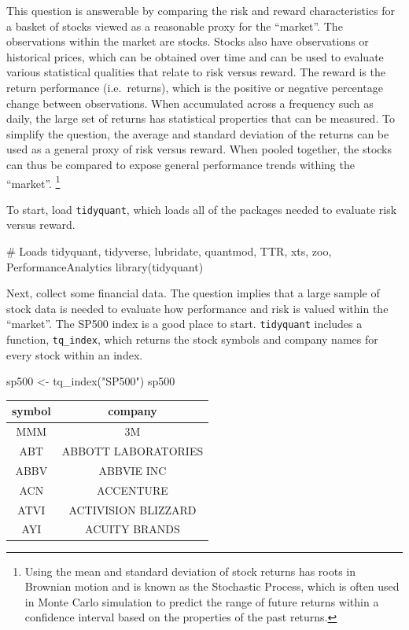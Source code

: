 This question is answerable by comparing the risk and reward
characteristics for a basket of stocks viewed as a reasonable proxy for
the ``market''. The observations within the market are stocks. Stocks
also have observations or historical prices, which can be obtained over
time and can be used to evaluate various statistical qualities that
relate to risk versus reward. The reward is the return performance
(i.e.~returns), which is the positive or negative percentage change
between observations. When accumulated across a frequency such as daily,
the large set of returns has statistical properties that can be
measured. To simplify the question, the average and standard deviation
of the returns can be used as a general proxy of risk versus reward.
When pooled together, the stocks can thus be compared to expose general
performance trends withing the ``market''.
\footnote{Using the mean and standard deviation of stock returns has roots in Brownian motion and is known as the Stochastic Process, which is often used in Monte Carlo simulation to predict the range of future returns within a confidence interval based on the properties of the past returns. }

To start, load \texttt{tidyquant}, which loads all of the packages
needed to evaluate risk versus reward.

\begin{Schunk}
\begin{Sinput}
# Loads tidyquant, tidyverse, lubridate, quantmod, TTR, xts, zoo, PerformanceAnalytics
library(tidyquant)
\end{Sinput}
\end{Schunk}

Next, collect some financial data. The question implies that a large
sample of stock data is needed to evaluate how performance and risk is
valued within the ``market''. The SP500 index is a good place to start.
\texttt{tidyquant} includes a function, \texttt{tq\_index}, which
returns the stock symbols and company names for every stock within an
index.

\begin{Schunk}
\begin{Sinput}
sp500 <- tq_index("SP500")
sp500
\end{Sinput}
\end{Schunk}

\begin{tabular}{cc}
\toprule
symbol & company\\
\midrule
MMM & 3M\\
ABT & ABBOTT LABORATORIES\\
ABBV & ABBVIE INC\\
ACN & ACCENTURE\\
ATVI & ACTIVISION BLIZZARD\\
AYI & ACUITY BRANDS\\
\bottomrule
\end{tabular}

